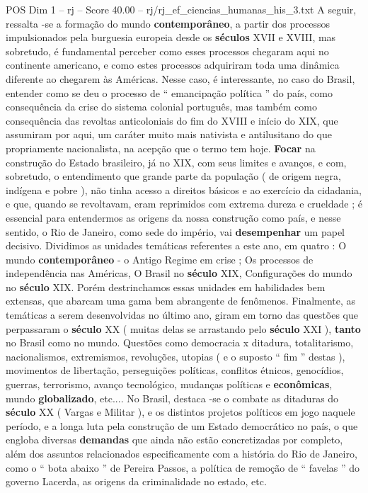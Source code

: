 \begin{textsample}{POS Dim 1 – rj – Score 40.00 – rj/rj\_ef\_ciencias\_humanas\_his\_3.txt}
A seguir, ressalta -se a formação do mundo \textbf{contemporâneo}, a partir dos processos impulsionados pela burguesia europeia desde os \textbf{séculos} XVII e XVIII, mas sobretudo, é fundamental perceber como esses processos chegaram aqui no continente americano, e como estes processos adquiriram toda uma dinâmica diferente ao chegarem às Américas.
Nesse caso, é interessante, no caso do Brasil, entender como se deu o processo de “ emancipação política ” do país, como consequência da crise do sistema colonial português, mas também como consequência das revoltas anticoloniais do fim do XVIII e início do XIX, que assumiram por aqui, um caráter muito mais nativista e antilusitano do que propriamente nacionalista, na acepção que o termo tem hoje. \textbf{Focar} na construção do Estado brasileiro, já no XIX, com seus limites e avanços, e com, sobretudo, o entendimento que grande parte da população ( de origem negra, indígena e pobre ), não tinha acesso a direitos básicos e ao exercício da cidadania, e que, quando se revoltavam, eram reprimidos com extrema dureza e crueldade ; é essencial para entendermos as origens da nossa construção como país, e nesse sentido, o Rio de Janeiro, como sede do império, vai \textbf{desempenhar} um papel decisivo.
Dividimos as unidades temáticas referentes a este ano, em quatro : O mundo \textbf{contemporâneo} - o Antigo Regime em crise ; Os processos de independência nas Américas, O Brasil no \textbf{século} XIX, Configurações do mundo no \textbf{século} XIX.
Porém destrinchamos essas unidades em habilidades bem extensas, que abarcam uma gama bem abrangente de fenômenos.
Finalmente, as temáticas a serem desenvolvidas no último ano, giram em torno das questões que perpassaram o \textbf{século} XX ( muitas delas se arrastando pelo \textbf{século} XXI ), \textbf{tanto} no Brasil como no mundo.
Questões como democracia x ditadura, totalitarismo, nacionalismos, extremismos, revoluções, utopias ( e o suposto “ fim ” destas ), movimentos de libertação, perseguições políticas, conflitos étnicos, genocídios, guerras, terrorismo, avanço tecnológico, mudanças políticas e \textbf{econômicas}, mundo \textbf{globalizado}, etc....
No Brasil, destaca -se o combate as ditaduras do \textbf{século} XX ( Vargas e Militar ), e os distintos projetos políticos em jogo naquele período, e a longa luta pela construção de um Estado democrático no país, o que engloba diversas \textbf{demandas} que ainda não estão concretizadas por completo, além dos assuntos relacionados especificamente com a história do Rio de Janeiro, como o “ bota abaixo ” de Pereira Passos, a política de remoção de “ favelas ” do governo Lacerda, as origens da criminalidade no estado, etc.

\end{textsample}
